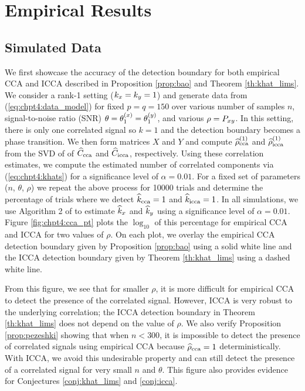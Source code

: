 \section{Empirical Results}\label{sec:chpt4:emp}

\subsection{Simulated Data}

We first showcase the accuracy of the detection boundary for both empirical CCA and ICCA
described in Proposition \ref{prop:bao} and Theorem \ref{th:khat_lims}. We consider a
rank-1 setting ($k_x=k_y=1$) and generate data from (\ref{eq:chpt4:data_model}) for fixed
$p=q=150$ over various number of samples $n$, signal-to-noise ratio (SNR)
$\theta=\theta^{(x)}_1=\theta^{(y)}_1$, and various $\rho=P_{xy}$. In this setting, there is only one
correlated signal so $k=1$ and the detection boundary becomes a phase transition. We
then form matrices $X$ and $Y$ and compute $\widehat{\rho}_\text{cca}^{(1)}$ and
$\widehat{\rho}_\text{icca}^{(1)}$ from the SVD of of $\widehat{C}_{\text{cca}}$ and $\widehat{C}_{\text{icca}}$, respectively. Using
these correlation estimates, we compute the estimated number of correlated components via
(\ref{eq:chpt4:khats}) for a significance level of $\alpha=0.01$. For a fixed set of
parameters ($n$, $\theta$, $\rho$) we repeat the above process for 10000 trials and
determine the percentage of trials where we detect $\widehat{k}_{\text{cca}}=1$ and $\widehat{k}_{\text{icca}}=1$. In all
simulations, we use Algorithm 2 of \cite{nadakuditi2010fundamental} to estimate $\widehat{k}_x$
and $\widehat{k}_y$ using a significance level of $\alpha=0.01$. Figure \ref{fig:chpt4:cca_pt}
plots the $\log_{10}$ of this percentage for empirical CCA and ICCA for two values of
$\rho$. On each plot, we overlay the empirical CCA detection boundary given by Proposition
\ref{prop:bao} using a solid white line and the ICCA detection boundary given by
Theorem \ref{th:khat_lims} using a dashed white line.

From this figure, we see that for smaller $\rho$, it is more difficult for empirical CCA
to detect the presence of the correlated signal. However, ICCA is very robust to the
underlying correlation; the ICCA detection boundary in Theorem \ref{th:khat_lims} does not
depend on the value of $\rho$. We also verify Proposition \ref{prop:pezeshki} showing that
when $n<300$, it is impossible to detect the presence of correlated signals using
empirical CCA because $\widehat{\rho}_\text{cca}=1$ deterministically. With ICCA, we avoid this
undesirable property and can still detect the presence of a correlated signal for very
small $n$ and $\theta$. This figure also provides evidence for Conjectures
\ref{conj:khat_lims} and \ref{conj:icca}.

